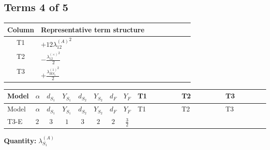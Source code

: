 \documentclass[8pt]{article}
\begin{document}
\begin{landscape}
\subsection*{Terms 4 of 5}
\begin{center}
\begin{tabular}{@{}c >{\raggedright\arraybackslash}p{0.82\linewidth}@{}}
\toprule
Column & Representative term structure \\
\midrule
T1 & \(\displaystyle +12 {\lambda_{12}^{(A)}}^2\) \\
\midrule
T2 & \(\displaystyle -\frac{{\lambda_{12}^{(\times)}}^2}{2}\) \\
\midrule
T3 & \(\displaystyle +\frac{{\lambda_{HS_1}^{(1)}}^2}{2}\) \\
\midrule
\bottomrule
\end{tabular}
\end{center}
\smallskip
\tiny
\begin{longtable}{@{}llcccccc >{\raggedright\arraybackslash}p{0.21\linewidth} >{\raggedright\arraybackslash}p{0.21\linewidth} >{\raggedright\arraybackslash}p{0.21\linewidth}@{}}
\toprule
Model & $\alpha$ & $d_{S_1}$ & $Y_{S_1}$ & $d_{S_2}$ & $Y_{S_2}$ & $d_F$ & $Y_F$ & T1 & T2 & T3 \\
\midrule
\endfirsthead
\toprule
Model & $\alpha$ & $d_{S_1}$ & $Y_{S_1}$ & $d_{S_2}$ & $Y_{S_2}$ & $d_F$ & $Y_F$ & T1 & T2 & T3 \\
\midrule
\endhead
T3-E & $2$ & $3$ & $1$ & $3$ & $2$ & $2$ & $\frac{3}{2}$ & \scriptsize\adjustbox{max width=\linewidth}{$\begin{gathered} +12 {\lambda_{12}^{(A)}}^2\end{gathered}$} & \scriptsize\adjustbox{max width=\linewidth}{$\begin{gathered} -\frac{{\lambda_{12}^{(\times)}}^2}{2}\end{gathered}$} & \scriptsize\adjustbox{max width=\linewidth}{$\begin{gathered} +\frac{{\lambda_{HS_1}^{(1)}}^2}{2}\end{gathered}$} \\
\midrule
\bottomrule
\end{longtable}
\clearpage
\noindent\textbf{Quantity: }$\lambda_{S_1}^{(A)}$\par\smallskip

\end{landscape}
\end{document}

